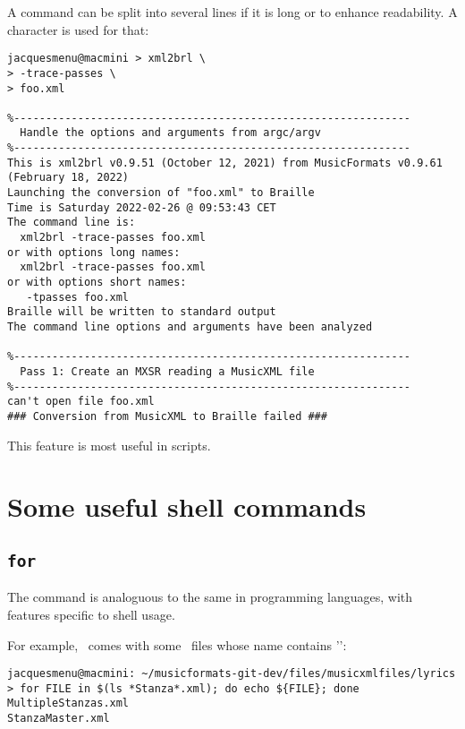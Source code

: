 A command can be split into several lines if it is long or to enhance readability. A \code{\textbackslash} character is used for that:
\begin{lstlisting}[language=Terminal]
jacquesmenu@macmini > xml2brl \
> -trace-passes \
> foo.xml

%--------------------------------------------------------------
  Handle the options and arguments from argc/argv
%--------------------------------------------------------------
This is xml2brl v0.9.51 (October 12, 2021) from MusicFormats v0.9.61 (February 18, 2022)
Launching the conversion of "foo.xml" to Braille
Time is Saturday 2022-02-26 @ 09:53:43 CET
The command line is:
  xml2brl -trace-passes foo.xml
or with options long names:
  xml2brl -trace-passes foo.xml
or with options short names:
   -tpasses foo.xml
Braille will be written to standard output
The command line options and arguments have been analyzed

%--------------------------------------------------------------
  Pass 1: Create an MXSR reading a MusicXML file
%--------------------------------------------------------------
can't open file foo.xml
### Conversion from MusicXML to Braille failed ###
\end{lstlisting}

This feature is most useful in scripts.


\section{Some useful shell commands}

\subsection{{\tt for}}

The \code{for} command is analoguous to the same in programming languages, with features specific to shell usage.

For example, \mf\ comes with some \mxml\ files whose name contains '\code{Stanza}':
\begin{lstlisting}[language=Terminal]
jacquesmenu@macmini: ~/musicformats-git-dev/files/musicxmlfiles/lyrics > for FILE in $(ls *Stanza*.xml); do echo ${FILE}; done
MultipleStanzas.xml
StanzaMaster.xml
\end{lstlisting}

